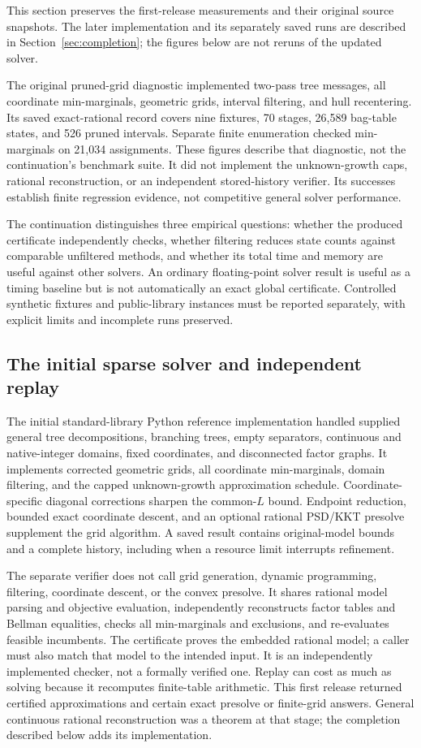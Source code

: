 This section preserves the first-release measurements and their original
source snapshots. The later implementation and its separately saved runs
are described in Section~\ref{sec:completion}; the figures below are not
reruns of the updated solver.

The original pruned-grid diagnostic implemented two-pass tree messages,
all coordinate min-marginals, geometric grids, interval filtering, and
hull recentering. Its saved exact-rational record covers nine fixtures,
70 stages, 26,589 bag-table states, and 526 pruned intervals. Separate
finite enumeration checked min-marginals on 21,034 assignments. These
figures describe that diagnostic, not the continuation's benchmark suite.
It did not implement the unknown-growth caps, rational reconstruction,
or an independent stored-history verifier. Its successes establish
finite regression evidence, not competitive general solver performance.

The continuation distinguishes three empirical questions: whether the
produced certificate independently checks, whether filtering reduces
state counts against comparable unfiltered methods, and whether its
total time and memory are useful against other solvers. An ordinary
floating-point solver result is useful as a timing baseline but is not
automatically an exact global certificate. Controlled synthetic fixtures
and public-library instances must be reported separately, with explicit
limits and incomplete runs preserved.

\subsection{The initial sparse solver and independent replay}
The initial standard-library Python reference implementation handled supplied
general tree decompositions, branching trees, empty separators, continuous
and native-integer domains, fixed coordinates, and disconnected factor
graphs. It implements corrected geometric grids, all coordinate
min-marginals, domain filtering, and the capped unknown-growth
approximation schedule. Coordinate-specific diagonal corrections sharpen
the common-$L$ bound. Endpoint reduction, bounded exact coordinate
descent, and an optional rational PSD/KKT presolve supplement the grid
algorithm. A saved result contains original-model bounds and a complete
history, including when a resource limit interrupts refinement.

The separate verifier does not call grid generation, dynamic programming,
filtering, coordinate descent, or the convex presolve. It shares rational
model parsing and objective evaluation, independently reconstructs factor
tables and Bellman equalities, checks all min-marginals and exclusions,
and re-evaluates feasible incumbents. The certificate proves the embedded
rational model; a caller must also match that model to the intended input.
It is an independently implemented checker, not a formally verified one.
Replay can cost as much as solving because it recomputes finite-table
arithmetic. This first release returned certified approximations and certain
exact presolve or finite-grid answers. General continuous rational
reconstruction was a theorem at that stage; the completion described below
adds its implementation.


